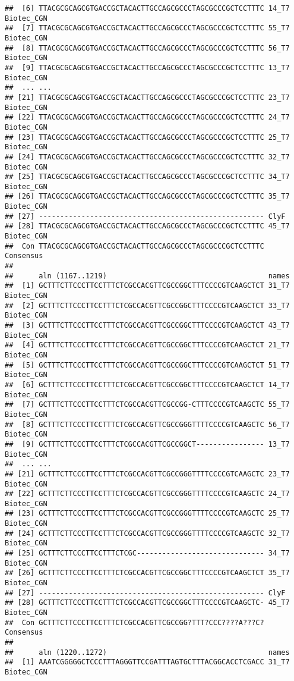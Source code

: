 \documentclass[
]{article}
\begin{document}
\begin{verbatim}
##  [6] TTACGCGCAGCGTGACCGCTACACTTGCCAGCGCCCTAGCGCCCGCTCCTTTC 14_T7 Biotec_CGN
##  [7] TTACGCGCAGCGTGACCGCTACACTTGCCAGCGCCCTAGCGCCCGCTCCTTTC 55_T7 Biotec_CGN
##  [8] TTACGCGCAGCGTGACCGCTACACTTGCCAGCGCCCTAGCGCCCGCTCCTTTC 56_T7 Biotec_CGN
##  [9] TTACGCGCAGCGTGACCGCTACACTTGCCAGCGCCCTAGCGCCCGCTCCTTTC 13_T7 Biotec_CGN 
##  ... ...
## [21] TTACGCGCAGCGTGACCGCTACACTTGCCAGCGCCCTAGCGCCCGCTCCTTTC 23_T7 Biotec_CGN
## [22] TTACGCGCAGCGTGACCGCTACACTTGCCAGCGCCCTAGCGCCCGCTCCTTTC 24_T7 Biotec_CGN
## [23] TTACGCGCAGCGTGACCGCTACACTTGCCAGCGCCCTAGCGCCCGCTCCTTTC 25_T7 Biotec_CGN
## [24] TTACGCGCAGCGTGACCGCTACACTTGCCAGCGCCCTAGCGCCCGCTCCTTTC 32_T7 Biotec_CGN
## [25] TTACGCGCAGCGTGACCGCTACACTTGCCAGCGCCCTAGCGCCCGCTCCTTTC 34_T7 Biotec_CGN
## [26] TTACGCGCAGCGTGACCGCTACACTTGCCAGCGCCCTAGCGCCCGCTCCTTTC 35_T7 Biotec_CGN
## [27] ----------------------------------------------------- ClyF
## [28] TTACGCGCAGCGTGACCGCTACACTTGCCAGCGCCCTAGCGCCCGCTCCTTTC 45_T7 Biotec_CGN
##  Con TTACGCGCAGCGTGACCGCTACACTTGCCAGCGCCCTAGCGCCCGCTCCTTTC Consensus 
## 
##      aln (1167..1219)                                      names
##  [1] GCTTTCTTCCCTTCCTTTCTCGCCACGTTCGCCGGCTTTCCCCGTCAAGCTCT 31_T7 Biotec_CGN
##  [2] GCTTTCTTCCCTTCCTTTCTCGCCACGTTCGCCGGCTTTCCCCGTCAAGCTCT 33_T7 Biotec_CGN
##  [3] GCTTTCTTCCCTTCCTTTCTCGCCACGTTCGCCGGCTTTCCCCGTCAAGCTCT 43_T7 Biotec_CGN
##  [4] GCTTTCTTCCCTTCCTTTCTCGCCACGTTCGCCGGCTTTCCCCGTCAAGCTCT 21_T7 Biotec_CGN
##  [5] GCTTTCTTCCCTTCCTTTCTCGCCACGTTCGCCGGCTTTCCCCGTCAAGCTCT 51_T7 Biotec_CGN
##  [6] GCTTTCTTCCCTTCCTTTCTCGCCACGTTCGCCGGCTTTCCCCGTCAAGCTCT 14_T7 Biotec_CGN
##  [7] GCTTTCTTCCCTTCCTTTCTCGCCACGTTCGCCGG-CTTTCCCCGTCAAGCTC 55_T7 Biotec_CGN
##  [8] GCTTTCTTCCCTTCCTTTCTCGCCACGTTCGCCGGGTTTTCCCCGTCAAGCTC 56_T7 Biotec_CGN
##  [9] GCTTTCTTCCCTTCCTTTCTCGCCACGTTCGCCGGCT---------------- 13_T7 Biotec_CGN 
##  ... ...
## [21] GCTTTCTTCCCTTCCTTTCTCGCCACGTTCGCCGGGTTTTCCCCGTCAAGCTC 23_T7 Biotec_CGN
## [22] GCTTTCTTCCCTTCCTTTCTCGCCACGTTCGCCGGGTTTTCCCCGTCAAGCTC 24_T7 Biotec_CGN
## [23] GCTTTCTTCCCTTCCTTTCTCGCCACGTTCGCCGGGTTTTCCCCGTCAAGCTC 25_T7 Biotec_CGN
## [24] GCTTTCTTCCCTTCCTTTCTCGCCACGTTCGCCGGGTTTTCCCCGTCAAGCTC 32_T7 Biotec_CGN
## [25] GCTTTCTTCCCTTCCTTTCTCGC------------------------------ 34_T7 Biotec_CGN
## [26] GCTTTCTTCCCTTCCTTTCTCGCCACGTTCGCCGGCTTTCCCCGTCAAGCTCT 35_T7 Biotec_CGN
## [27] ----------------------------------------------------- ClyF
## [28] GCTTTCTTCCCTTCCTTTCTCGCCACGTTCGCCGGCTTTCCCCGTCAAGCTC- 45_T7 Biotec_CGN
##  Con GCTTTCTTCCCTTCCTTTCTCGCCACGTTCGCCGG?TTT?CCC????A???C? Consensus 
## 
##      aln (1220..1272)                                      names
##  [1] AAATCGGGGGCTCCCTTTAGGGTTCCGATTTAGTGCTTTACGGCACCTCGACC 31_T7 Biotec_CGN

\end{verbatim}
\end{document}
